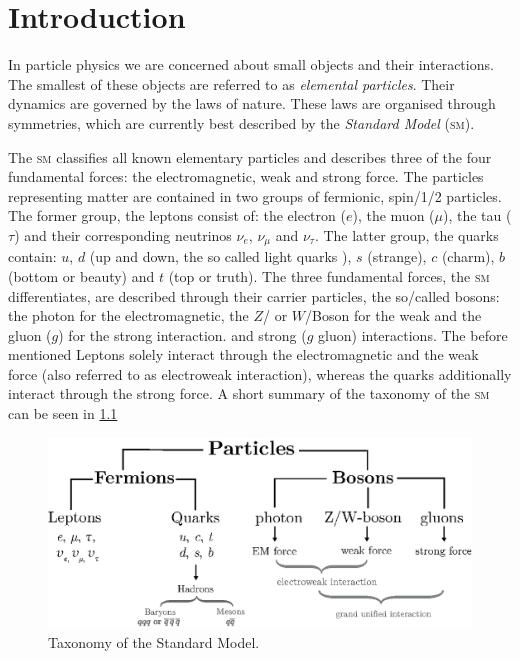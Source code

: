 \documentclass[../../index.tex]{subfiles}
\begin{document}
\chapter{Introduction}
In particle physics we are concerned about small objects and their interactions.
The smallest of these objects are referred to as \textit{elemental particles}.
Their dynamics are governed by the laws of nature. These laws are organised
through symmetries, which are currently best described by the \textit{Standard
  Model} (\textsc{sm}).

The \textsc{sm} classifies all known elementary particles and describes three of
the four fundamental forces: the electromagnetic, weak and strong force. The
particles representing matter are contained in two groups of fermionic,
spin\-/1/2 particles. The former group, the leptons consist of: the electron
($e$), the muon ($\mu$), the tau ($\tau$) and their corresponding neutrinos
$\nu_e$, $\nu_\mu$ and $\nu_\tau$. The latter group, the quarks contain: $u$,
$d$ (up and down, the so called light quarks ), $s$ (strange), $c$ (charm), $b$
(bottom or beauty) and $t$ (top or truth). The three fundamental forces, the
\textsc{sm} differentiates, are described through their carrier particles, the
so\-/called bosons: the photon for the electromagnetic, the $Z$\-/ or
$W$\-/Boson for the weak and the gluon ($g$) for the strong interaction. and
strong ($g$ gluon) interactions. The before mentioned Leptons solely interact
through the electromagnetic and the weak force (also referred to as electroweak
interaction), whereas the quarks additionally interact through the strong force.
A short summary of the taxonomy of the \textsc{sm} can be seen in
\cref{fig:SMTaxonomy}
\begin{figure}
  \centering
  \includegraphics[width=\textwidth]{./images/standardModelTaxonomy.eps}
  \caption{Taxonomy of the Standard Model.}
  \label{fig:SMTaxonomy}
\end{figure}
\end{document}
